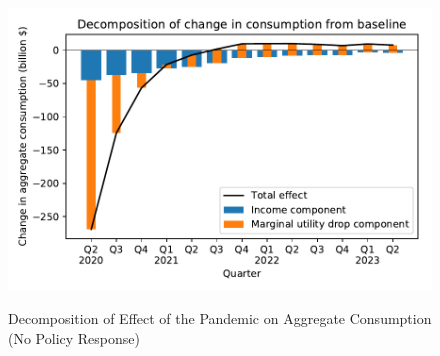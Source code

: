 \documentclass[titlepage]{\econtex}
\begin{document}
\begin{figure}
  \centering
  \caption{Decomposition of Effect of the Pandemic on Aggregate Consumption (No Policy Response)}
  \label{cons_response2}
  { \includegraphics[width=8in]{./Figures/Decomposition}}
\end{figure}
\end{document}

